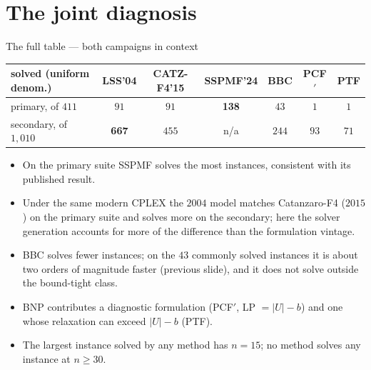 \documentclass[10pt]{beamer}
\newcommand{\U}{U}\newcommand{\Kst}{K^{\ast}}\newcommand{\Zst}{Z^{\ast}}
\newcommand{\cov}{\lvert\U\rvert-b}
\begin{document}
\section{The joint diagnosis}
\begin{frame}{The full table --- both campaigns in context}
\centering\small
\begin{tabular}{lcccccc}
\toprule
solved (uniform denom.) & LSS'04 & CATZ-F4'15 & SSPMF'24 & \textbf{BBC} & \textbf{PCF$'$} & \textbf{PTF}\\
\midrule
primary, of $411$    & $91$  & $91$  & \textbf{138} & $43$  & $1$  & $1$\\
secondary, of $1{,}010$ & \textbf{667} & $455$ & n/a & $244$ & $93$ & $71$\\
\bottomrule
\end{tabular}
\vspace{2mm}
\begin{itemize}
  \item On the primary suite SSPMF solves the most instances, consistent with its
        published result.
  \item Under the same modern CPLEX the $2004$ model matches Catanzaro-F4 ($2015$) on the
        primary suite and solves more on the secondary; here the solver generation
        accounts for more of the difference than the formulation vintage.
  \item BBC solves fewer instances; on the $43$ commonly solved instances it is about two
        orders of magnitude faster (previous slide), and it does not solve outside the
        bound-tight class.
  \item BNP contributes a diagnostic formulation (PCF$'$, LP $=\cov$) and one whose
        relaxation can exceed $\cov$ (PTF).
  \item The largest instance solved by any method has $n=15$; no method solves any
        instance at $n\ge30$.
\end{itemize}
\end{frame}
\end{document}
